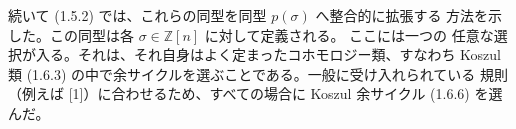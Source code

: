 続いて (1.5.2) では、これらの同型を同型 $p(\sigma)$ へ整合的に拡張する
方法を示した。この同型は各 $\sigma\in\mathbb Z[n]$ に対して定義される。
ここには一つの
任意な選択が入る。それは、それ自身はよく定まったコホモロジー類、すなわち
Koszul 類 (1.6.3) の中で余サイクルを選ぶことである。一般に受け入れられている
規則（例えば [1]）に合わせるため、すべての場合に Koszul 余サイクル (1.6.6)
を選んだ。
\endgroup
